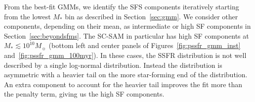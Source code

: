 \documentclass[tighten, preprint]{aastex62}
\begin{document}
From the best-fit GMMs, we identify the SFS components iteratively starting 
from the lowest $M_*$ bin as described in Section~\ref{sec:gmm}. We 
consider other components, depending on their mean, as intermediate or high 
SF components in Section~\ref{sec:beyondsfms}. The SC-SAM in particular has 
high SF components at $M_* \lesssim 10^{10}M_\sun$ (bottom left and center 
panels of Figures~\ref{fig:pssfr_gmm_inst}  and~\ref{fig:pssfr_gmm_100myr}).
In these cases, the SSFR distribution is not well described by a single 
log-normal distribution. Instead the distribution is asymmetric with a 
heavier tail on the more star-forming end of the distribution. An
extra component to account for the heavier tail improves the fit more 
than the penalty term, giving us the high SF components.


\end{document}
